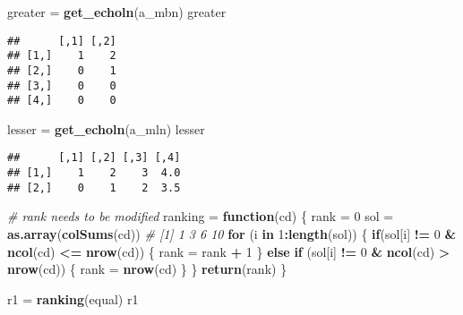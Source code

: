 \documentclass[]{article}
\newenvironment{Shaded}{\begin{snugshade}}{\end{snugshade}}
\newcommand{\CommentTok}[1]{\textcolor[rgb]{0.56,0.35,0.01}{\textit{#1}}}
\newcommand{\ControlFlowTok}[1]{\textcolor[rgb]{0.13,0.29,0.53}{\textbf{#1}}}
\newcommand{\DecValTok}[1]{\textcolor[rgb]{0.00,0.00,0.81}{#1}}
\newcommand{\KeywordTok}[1]{\textcolor[rgb]{0.13,0.29,0.53}{\textbf{#1}}}
\newcommand{\NormalTok}[1]{#1}
\newcommand{\OperatorTok}[1]{\textcolor[rgb]{0.81,0.36,0.00}{\textbf{#1}}}
\newcommand{\StringTok}[1]{\textcolor[rgb]{0.31,0.60,0.02}{#1}}
\begin{document}
\begin{Shaded}
\begin{Highlighting}[]
\NormalTok{greater =}\StringTok{ }\KeywordTok{get_echoln}\NormalTok{(a_mbn)}
\NormalTok{greater}
\end{Highlighting}
\end{Shaded}

\begin{verbatim}
##      [,1] [,2]
## [1,]    1    2
## [2,]    0    1
## [3,]    0    0
## [4,]    0    0
\end{verbatim}

\begin{Shaded}
\begin{Highlighting}[]
\NormalTok{lesser =}\StringTok{ }\KeywordTok{get_echoln}\NormalTok{(a_mln)}
\NormalTok{lesser}
\end{Highlighting}
\end{Shaded}

\begin{verbatim}
##      [,1] [,2] [,3] [,4]
## [1,]    1    2    3  4.0
## [2,]    0    1    2  3.5
\end{verbatim}

\begin{Shaded}
\begin{Highlighting}[]
\CommentTok{# rank needs to be modified}
\NormalTok{ranking =}\StringTok{ }\ControlFlowTok{function}\NormalTok{(cd) \{}
\NormalTok{  rank =}\StringTok{ }\DecValTok{0}
\NormalTok{  sol =}\StringTok{ }\KeywordTok{as.array}\NormalTok{(}\KeywordTok{colSums}\NormalTok{(cd))}
  \CommentTok{# [1]  1  3  6 10}
  \ControlFlowTok{for}\NormalTok{ (i }\ControlFlowTok{in} \DecValTok{1}\OperatorTok{:}\KeywordTok{length}\NormalTok{(sol)) \{}
    \ControlFlowTok{if}\NormalTok{(sol[i] }\OperatorTok{!=}\StringTok{ }\DecValTok{0} \OperatorTok{&}\StringTok{ }\KeywordTok{ncol}\NormalTok{(cd) }\OperatorTok{<=}\StringTok{ }\KeywordTok{nrow}\NormalTok{(cd)) \{}
\NormalTok{      rank =}\StringTok{ }\NormalTok{rank }\OperatorTok{+}\StringTok{ }\DecValTok{1}
\NormalTok{    \} }\ControlFlowTok{else} \ControlFlowTok{if}\NormalTok{ (sol[i] }\OperatorTok{!=}\StringTok{ }\DecValTok{0} \OperatorTok{&}\StringTok{ }\KeywordTok{ncol}\NormalTok{(cd) }\OperatorTok{>}\StringTok{ }\KeywordTok{nrow}\NormalTok{(cd)) \{}
\NormalTok{      rank =}\StringTok{ }\KeywordTok{nrow}\NormalTok{(cd)}
\NormalTok{    \}}
\NormalTok{  \}}
  \KeywordTok{return}\NormalTok{(rank)}
\NormalTok{\}}

\NormalTok{r1 =}\StringTok{ }\KeywordTok{ranking}\NormalTok{(equal)}
\NormalTok{r1}
\end{Highlighting}
\end{Shaded}
\end{document}
